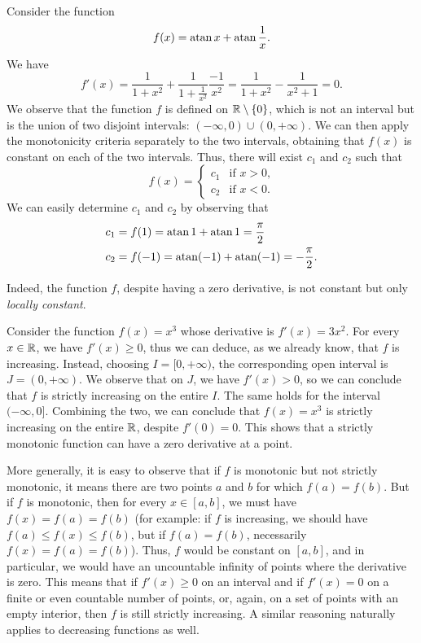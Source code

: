 \begin{example}
Consider the function
\[
  f(x) = \operatorname{atan} x + \operatorname{atan}\frac 1 x.
\]
We have
\[
  f'(x) = \frac{1}{1+ x^2} + \frac{1}{1 + \frac {1}{x^2}} \frac{-1}{x^2}
    = \frac {1}{1+x^2} - \frac{1}{x^2 + 1} = 0.
\]
We observe that the function $f$ is defined on ${\mathbb R}\setminus {\left\{ 0 \right\}}$, which
is not an interval but is the union of two disjoint intervals: $(-\infty, 0)
\cup (0, +\infty)$. We can then apply the monotonicity criteria separately to
the two intervals, obtaining that $f(x)$ is constant on each of the two
intervals. Thus, there will exist $c_1$ and $c_2$ such that
\[
  f(x) = \begin{cases} c_1 & \text{if $x>0$,} \\
  c_2 & \text{if $x<0$.}
  \end{cases}
\]
We can easily determine $c_1$ and $c_2$ by observing that
\begin{align*}
c_1 &= f(1) = \operatorname{atan} 1 + \operatorname{atan} 1 = \frac{\pi}{2} \\
c_2 &= f(-1) = \operatorname{atan} (-1) + \operatorname{atan} (-1) = - \frac{\pi}{2}.
\end{align*}
\end{example}
Indeed, the function $f$, despite having a zero derivative, is not constant but
only \emph{locally constant}.

\begin{example}
Consider the function $f(x) = x^3$ whose derivative is $f'(x) = 3x^2$. For every
$x\in {\mathbb R}$, we have $f'(x)\ge 0$, thus we can deduce, as we already know, that
$f$ is increasing. Instead, choosing $I = [0,+\infty)$, the corresponding open
interval is $J=(0,+\infty)$. We observe that on $J$, we have $f'(x) > 0$, so we
can conclude that $f$ is strictly increasing on the entire $I$. The same holds
for the interval $(-\infty,0]$. Combining the two, we can conclude that $f(x) =
x^3$ is strictly increasing on the entire ${\mathbb R}$, despite $f'(0)=0$. This shows
that a strictly monotonic function can have a zero derivative at a point.
\end{example}

More generally, it is easy to observe that if $f$ is monotonic but not strictly
monotonic, it means there are two points $a$ and $b$ for which $f(a) = f(b)$.
But if $f$ is monotonic, then for every $x\in [a,b]$, we must have $f(x) = f(a)
= f(b)$ (for example: if $f$ is increasing, we should have $f(a) \le f(x) \le
f(b)$, but if $f(a)=f(b)$, necessarily $f(x)=f(a)=f(b)$). Thus, $f$ would be
constant on $[a,b]$, and in particular, we would have an uncountable infinity of
points where the derivative is zero. This means that if $f'(x)\ge 0$ on an
interval and if $f'(x)=0$ on a finite or even countable number of points, or,
again, on a set of points with an empty interior, then $f$ is still strictly
increasing. A similar reasoning naturally applies to decreasing functions as
well.

